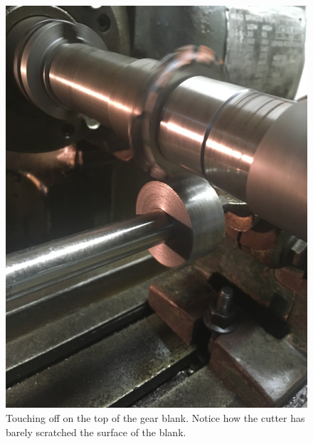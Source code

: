 \documentclass[12pt,twoside,letterpaper]{article}
\begin{document}
\begin{figure}[H]
\centering
	\includegraphics[width=4.5in]{touchOff}
	\caption{Touching off on the top of the gear blank. Notice how the cutter has barely scratched the surface of the blank.}
\end{figure}
\end{document}
